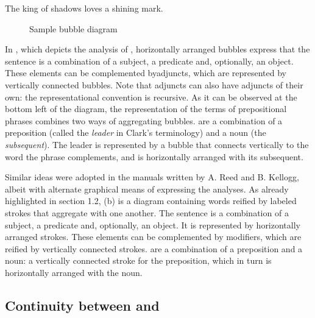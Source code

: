 \documentclass[output=paper]{langsci/langscibook}
\begin{document}
\ea \label{ex:4:2} The king of shadows loves a shining mark.
\z
  
\begin{figure}
    \caption{Sample bubble diagram \citep[23]{clark_science_1847}\label{fig:4:3}}
\end{figure}

In , which depicts the analysis of , horizontally arranged bubbles express that the sentence is a combination of a  subject, a predicate and, optionally, an object. These elements can be complemented byadjuncts, which are represented by vertically connected bubbles. Note that adjuncts can also have adjuncts of their own: the representational convention is recursive. As it can be observed at the bottom left of the diagram, the representation of the terms of prepositional phrases combines two ways of aggregating bubbles.  are a combination of a preposition (called the \textit{leader} in Clark’s terminology) and a noun (the \textit{subsequent}). The leader is represented by a bubble that connects vertically to the word the phrase complements, and is horizontally arranged with its subsequent.

Similar ideas were adopted in the manuals written by A. Reed and B. Kellogg, albeit with alternate graphical means of expressing the analyses. As already highlighted in section 1.2, (b) is a diagram containing words reified by labeled strokes that aggregate with one another. The sentence is a combination of a subject, a predicate and, optionally, an object. It is represented by horizontally arranged strokes. These elements can be complemented by modifiers, which are reified by vertically connected strokes.  are a combination of a preposition and a noun: a vertically connected stroke for the preposition, which in turn is horizontally arranged with the noun. 

\subsection{Continuity between \citet{clark_science_1847} and \citet{reed_graded_1879}}
\end{document}
